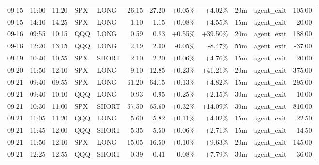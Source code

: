 \documentclass[11pt,a4paper]{article}
\begin{document}
\begin{center}
\begin{longtable}{>{\color{txtmain}}l l l l l r r r r r >{\color{txtmain}}l r}
09-15 & 11:00 & 11:20 & SPX & LONG & 26.15 & 27.20 & \textcolor{wingreen}{+0.05\%} & \textcolor{wingreen}{+4.02\%} & 20m & agent\_exit & \textcolor{wingreen}{105.00} \\
09-15 & 14:10 & 14:25 & SPX & LONG & 1.10 & 1.15 & \textcolor{wingreen}{+0.08\%} & \textcolor{wingreen}{+4.55\%} & 15m & agent\_exit & \textcolor{wingreen}{20.00} \\
09-16 & 09:55 & 10:15 & QQQ & LONG & 0.59 & 0.83 & \textcolor{wingreen}{+0.55\%} & \textcolor{wingreen}{+39.50\%} & 20m & agent\_exit & \textcolor{wingreen}{188.00} \\
09-16 & 12:20 & 13:15 & QQQ & LONG & 2.19 & 2.00 & \textcolor{lossred}{-0.05\%} & \textcolor{lossred}{-8.47\%} & 55m & agent\_exit & \textcolor{lossred}{-37.00} \\
09-19 & 10:40 & 10:55 & SPX & SHORT & 2.10 & 2.20 & \textcolor{wingreen}{+0.06\%} & \textcolor{wingreen}{+4.76\%} & 15m & agent\_exit & \textcolor{wingreen}{20.00} \\
09-20 & 11:50 & 12:10 & SPX & LONG & 9.10 & 12.85 & \textcolor{wingreen}{+0.23\%} & \textcolor{wingreen}{+41.21\%} & 20m & agent\_exit & \textcolor{wingreen}{375.00} \\
09-21 & 09:40 & 09:55 & SPX & LONG & 61.20 & 64.15 & \textcolor{wingreen}{+0.13\%} & \textcolor{wingreen}{+4.82\%} & 15m & agent\_exit & \textcolor{wingreen}{295.00} \\
09-21 & 09:40 & 10:10 & QQQ & LONG & 0.93 & 0.95 & \textcolor{wingreen}{+0.25\%} & \textcolor{wingreen}{+2.15\%} & 30m & agent\_exit & \textcolor{wingreen}{10.00} \\
09-21 & 10:30 & 11:00 & SPX & SHORT & 57.50 & 65.60 & \textcolor{wingreen}{+0.32\%} & \textcolor{wingreen}{+14.09\%} & 30m & agent\_exit & \textcolor{wingreen}{810.00} \\
09-21 & 11:05 & 11:20 & QQQ & LONG & 5.60 & 5.82 & \textcolor{wingreen}{+0.11\%} & \textcolor{wingreen}{+4.02\%} & 15m & agent\_exit & \textcolor{wingreen}{22.50} \\
09-21 & 11:45 & 12:00 & QQQ & SHORT & 5.35 & 5.50 & \textcolor{wingreen}{+0.06\%} & \textcolor{wingreen}{+2.71\%} & 15m & agent\_exit & \textcolor{wingreen}{14.50} \\
09-21 & 11:50 & 12:10 & SPX & LONG & 15.05 & 16.50 & \textcolor{wingreen}{+0.10\%} & \textcolor{wingreen}{+9.63\%} & 20m & agent\_exit & \textcolor{wingreen}{145.00} \\
09-21 & 12:25 & 12:55 & QQQ & SHORT & 0.39 & 0.41 & \textcolor{lossred}{-0.08\%} & \textcolor{wingreen}{+7.79\%} & 30m & agent\_exit & \textcolor{wingreen}{36.00} \\

\end{longtable}
\end{center}
\end{document}
